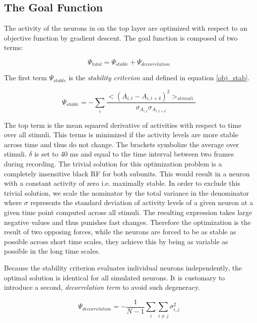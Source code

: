 	
\subsection{The Goal Function} 

The activity of the neurons in on the top layer are optimized with respect
to an objective function by gradient descent. The goal function is composed
of two terms: 

\begin{equation} \Psi_{total} = 	\Psi_{stable} + \Psi_{decorrelation}
\label{objfun} \end{equation}

The first term $\Psi_{stable}$ is the \textit{stability criterion} and
defined in equation \ref{obj_stab}.


\begin{equation}  \Psi_{stable} = -\sum_{i}
\frac{<(A_{i,t}-A_{i,t+\delta})^2>_{stimuli}}{\sigma_{A_{i,t}}\sigma_{A_{i,t+\delta}}}
\label{obj_stab}
\end{equation}

The top term is the mean squared derivative of activities with respect to
time over all stimuli. This terms is minimized if the activity levels are
more stable across time and thus do not change. The brackets symbolize the
average over stimuli. $\delta$ is set to 40 ms and equal to the time
interval between two frames during recording. The trivial solution for this
optimization problem is a completely insensitive black RF for both
subunits. This would result in a neuron with a constant activity of zero
i.e. maximally stable. In order to exclude this trivial solution, we scale
the nominator by the total variance in the denominator where $\sigma$
represents the standard deviation of activity levels of a given neuron at a
given time point computed across all stimuli. The resulting expression
takes large negative values and thus punishes fast changes. Therefore the
optimization is the result of two opposing forces, while the neurons are
forced to be as stable as possible across short time scales, they achieve
this by being as variable as possible in the long time scales.
	 
Because the stability criterion evaluates individual neurons independently,
the optimal solution is identical for all simulated neurons. It is
customary to introduce a second, \textit{decorrelation term} to avoid such
degeneracy.


\begin{equation}  \Psi_{decorrelation} =
-\frac{1}{N-1}\sum_{i} \sum_{i \not= j} \sigma_{i,j}^2 
\label{obj_decor}
\end{equation}

